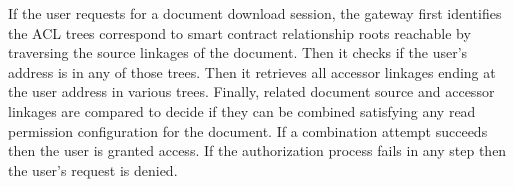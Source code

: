 If the user requests for a document download session, the gateway first identifies the ACL trees correspond to smart contract relationship roots reachable by traversing the source linkages of the document. Then it checks if the user's address is in any of those trees. Then it retrieves all accessor linkages ending at the user address in various trees. Finally, related document source and accessor linkages are compared to decide if they can be combined satisfying any read permission configuration for the document. If a combination attempt succeeds then the user is granted access. If the authorization process fails in any step then the user's request is denied.          
        
